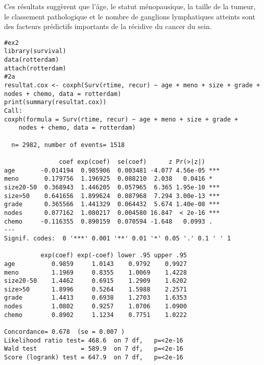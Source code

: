 \documentclass[../main.tex]{subfiles}
\begin{document}
\begin{CJK*}{UTF8}{gbsn}
Ces résultats suggèrent que l'âge, 
le statut ménopausique, la taille de la tumeur, 
le classement pathologique et le nombre de ganglions lymphatiques atteints 
sont des facteurs prédictifs importants de la récidive du cancer du sein.

\begin{lstlisting}
#ex2
library(survival)
data(rotterdam)
attach(rotterdam)
#2a
resultat.cox <- coxph(Surv(rtime, recur) ~ age + meno + size + grade + nodes + chemo, data = rotterdam)
print(summary(resultat.cox))
Call:
coxph(formula = Surv(rtime, recur) ~ age + meno + size + grade + 
    nodes + chemo, data = rotterdam)

  n= 2982, number of events= 1518 

               coef exp(coef)  se(coef)      z Pr(>|z|)    
age       -0.014194  0.985906  0.003481 -4.077 4.56e-05 ***
meno       0.179756  1.196925  0.088210  2.038   0.0416 *  
size20-50  0.368943  1.446205  0.057965  6.365 1.95e-10 ***
size>50    0.641656  1.899624  0.087968  7.294 3.00e-13 ***
grade      0.365566  1.441329  0.064432  5.674 1.40e-08 ***
nodes      0.077162  1.080217  0.004580 16.847  < 2e-16 ***
chemo     -0.116355  0.890159  0.070594 -1.648   0.0993 .  
---
Signif. codes:  0 '***' 0.001 '**' 0.01 '*' 0.05 '.' 0.1 ' ' 1

          exp(coef) exp(-coef) lower .95 upper .95
age          0.9859     1.0143    0.9792    0.9927
meno         1.1969     0.8355    1.0069    1.4228
size20-50    1.4462     0.6915    1.2909    1.6202
size>50      1.8996     0.5264    1.5988    2.2571
grade        1.4413     0.6938    1.2703    1.6353
nodes        1.0802     0.9257    1.0706    1.0900
chemo        0.8902     1.1234    0.7751    1.0222

Concordance= 0.678  (se = 0.007 )
Likelihood ratio test= 468.6  on 7 df,   p=<2e-16
Wald test            = 589.9  on 7 df,   p=<2e-16
Score (logrank) test = 647.9  on 7 df,   p=<2e-16

\end{lstlisting}
\end{CJK*}
\end{document}
